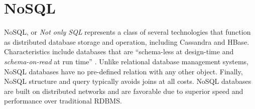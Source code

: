 \section{NoSQL}

NoSQL, or \textit{Not only SQL} represents a class of several
technologies that function as distributed database storage and
operation, including Cassandra and HBase.  Characteristics include
databases that are ``schema-less at design-time and
\textit{schema-on-read} at run time''
\cite{hid-sp18-407-nosql}. Unlike relational database management
systems, NoSQL databases have no pre-defined relation with any other
object. Finally, NoSQL structure and query typically avoids joins at
all costs. \cite{hid-sp18-407-nosql} NoSQL databases are built on
distributed networks and are favorable due to superior speed and
performance over traditional RDBMS.
